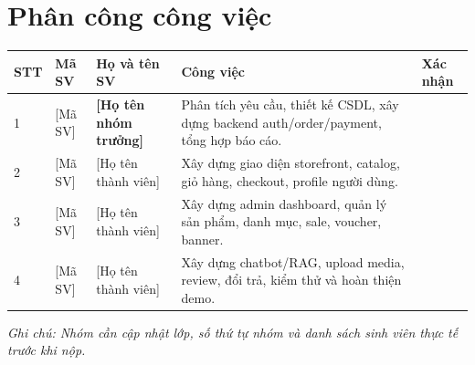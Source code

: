 \documentclass[12pt,a4paper]{report}
\begin{document}
\chapter*{Phân công công việc}

\begin{longtable}{|p{1cm}|p{2.6cm}|p{4cm}|p{6.4cm}|p{1.4cm}|}
\hline
\textbf{STT} & \textbf{Mã SV} & \textbf{Họ và tên SV} & \textbf{Công việc} & \textbf{Xác nhận} \\
\hline
1 & [Mã SV] & \textbf{[Họ tên nhóm trưởng]} & Phân tích yêu cầu, thiết kế CSDL, xây dựng backend auth/order/payment, tổng hợp báo cáo. & \\
\hline
2 & [Mã SV] & [Họ tên thành viên] & Xây dựng giao diện storefront, catalog, giỏ hàng, checkout, profile người dùng. & \\
\hline
3 & [Mã SV] & [Họ tên thành viên] & Xây dựng admin dashboard, quản lý sản phẩm, danh mục, sale, voucher, banner. & \\
\hline
4 & [Mã SV] & [Họ tên thành viên] & Xây dựng chatbot/RAG, upload media, review, đổi trả, kiểm thử và hoàn thiện demo. & \\
\hline
\end{longtable}

\noindent\textit{Ghi chú: Nhóm cần cập nhật lớp, số thứ tự nhóm và danh sách sinh viên thực tế trước khi nộp.}
\end{document}
